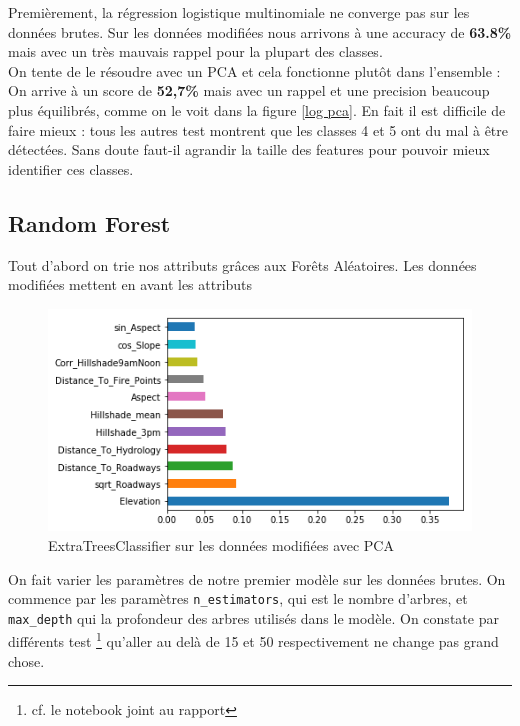 \documentclass[12pt,a4paper]{article}
\numberwithin{equation}{section}
\begin{document}
	Premièrement, la régression logistique multinomiale ne converge pas sur les données brutes. Sur les données modifiées nous arrivons à une accuracy de \textbf{63.8\%} mais avec un très mauvais rappel pour la plupart des classes. \\
	
	On tente de le résoudre avec un PCA et cela fonctionne plutôt dans l'ensemble : On arrive à un score de \textbf{52,7\%} mais avec un rappel et une precision beaucoup plus équilibrés, comme on le voit dans la figure \ref{log pca}. En fait il est difficile de faire mieux : tous les autres test montrent que les classes 4 et 5 ont  du mal à être détectées. Sans doute faut-il agrandir la taille des features pour pouvoir mieux identifier ces classes.
	
	\subsection{Random Forest}
	Tout d'abord on trie nos attributs grâces aux Forêts Aléatoires. Les données modifiées mettent en avant les attributs 
	
	\begin{figure}[h]
		\centering
		\includegraphics[width=1\linewidth]{img/importance.png}
		\caption{ExtraTreesClassifier sur les données modifiées avec PCA}
	\end{figure}
	
	On fait varier les paramètres de notre premier modèle sur les données brutes. On commence par les paramètres \texttt{n\_estimators}, qui est le nombre d'arbres, et \texttt{max\_depth} qui la profondeur des arbres utilisés dans le modèle. On constate par différents test \footnote{cf. le notebook joint au rapport} qu'aller au delà de 15 et 50 respectivement ne change pas grand chose.\\
	
\end{document}
